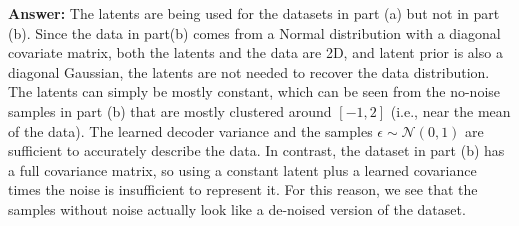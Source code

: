 \documentclass{article}
\begin{document}
\begin{enumerate}[(a)]
\textbf{Answer:} The latents are being used for the datasets in part (a) but not in part (b). Since the data in part(b) comes from a Normal distribution with a diagonal covariate matrix, both the latents and the data are 2D, and latent prior is also a diagonal Gaussian, the latents are not needed to recover the data distribution. The latents can simply be mostly constant, which can be seen from the no-noise samples in part (b) that are mostly clustered around $[-1, 2]$ (i.e., near the mean of the data). The learned decoder variance and the samples $\epsilon \sim \mathcal{N} (0, 1)$ are sufficient to accurately describe the data. In contrast, the dataset in part (b) has a full covariance matrix, so using a constant latent plus a learned covariance times the noise is insufficient to represent it. For this reason, we see that the samples without noise actually look like a de-noised version of the dataset.
\end{enumerate}



\newpage
{}
\end{document}
